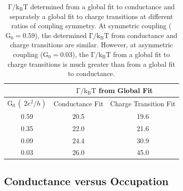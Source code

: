 \begin{table}[!hbt] 
\centering
\begin{tabular}{|c|c|c|}
\hline
\multicolumn{1}{|c|}{} & \multicolumn{2}{c|}{$\mathrm{\Gamma/k_BT}$ from Global Fit}\\
\hline
 $\mathrm{G_0}\,(\qty{}{2e^2/h})$ & Conductance Fit & Charge Transition Fit \\
\hline
0.59 & 20.5 & 19.6 \\
0.35 & 22.0 & 21.6 \\
0.09 & 24.4 & 30.9\\
0.03 & 26.0 & 45.0\\
\hline
\end{tabular}
 \caption[$\mathrm{\Gamma/k_BT}$ From Conductance and Charge Transition Global Fits]{\label{tab:sym_coupling_gf} $\mathrm{\Gamma/k_BT}$ determined from a global fit to conductance and separately a global fit to charge transitions at different ratios of coupling symmetry. At symmetric coupling ($\mathrm{G_0}=0.59$), the determined $\mathrm{\Gamma/k_BT}$ from conductance and charge transitions are similar. However, at asymmetric coupling ($\mathrm{G_0}=0.03$), the $\mathrm{\Gamma/k_BT}$ from a global fit to charge transitions is much greater than from a global fit to conductance.}
\end{table}


\subsection{Conductance versus Occupation}



